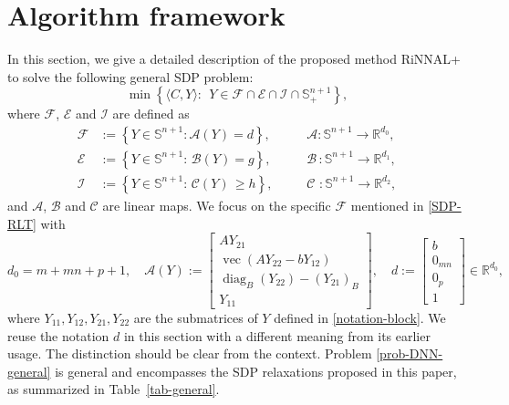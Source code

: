 \documentclass[11pt]{article}
\theoremstyle{plain}
\def\<{\big\langle}
\def\>{\big\rangle}
\def\E{\mathcal{E}}
\def\A{ \mathcal{A} }
\def\B{\mathcal{B}}
\def\C{\mathcal{C}}
\def\F{\mathcal{F}}
\def\I{\mathcal{I}}
\def\R{\mathbb{R}}
\def\S{\mathbb{S}}
\DeclareMathOperator{\diag}{diag}
\begin{document}

\section{Algorithm framework}\label{sec-alg}

In this section, we give a detailed description of the proposed method RiNNAL+ to solve the following general SDP problem:
\begin{equation}\label{prob-DNN-general}
\min\left\{
\<C,Y\>  :\  \
Y\in \F\cap \E\cap\I\cap \mathbb{S}_{+}^{n+1}
\right\},\tag{$P$}
\end{equation}
 where $\F$, $\E$ and $\I$ are defined as
 \begin{equation*}
\begin{aligned}
 \F&:=\left\{Y\in\S^{n+1} :  \mathcal{A}(Y)= {d}  \right\},\,&&\quad\A:\S^{n+1}\rightarrow\R^{d_0},\\
\E&:=\left\{Y\in  \mathbb{S}^{n+1} : \,\B(Y)={g} \right\},\,&&\quad\B\,:\S^{n+1}\rightarrow\R^{d_1},\\
\I &:=\left\{Y\in  \mathbb{S}^{n+1} : \,\C(Y)\,\geq h \right\},&&\quad\C\,\,:\S^{n+1}\rightarrow\R^{d_2},
 \end{aligned}
 \end{equation*}
and $\mathcal{A}$, $\mathcal{B}$ and $\mathcal{C}$ are linear maps.
We focus on the specific $\F$ mentioned in \eqref{SDP-RLT} with
\begin{equation*}
    d_0=m+mn+p+1,\quad
    \mathcal{A}(Y) := \begin{bmatrix}
        AY_{21}\\
        \operatorname{vec}(AY_{22}-bY_{12})\\
        \diag_B(Y_{22})-(Y_{21})_B\\
        Y_{11}
    \end{bmatrix},
    \quad  {d}  := \begin{bmatrix}
        b\\
        0_{mn}\\
        0_{p}\\
        1
    \end{bmatrix}\in\R^{d_0}, 
    \end{equation*}
where $Y_{11},Y_{12},Y_{21},Y_{22}$ are the submatrices of $Y$ defined in \eqref{notation-block}. 
We reuse the notation $d$ in this section with a different meaning from its earlier usage. The distinction should be clear from the context.
Problem \eqref{prob-DNN-general} is general and encompasses the SDP relaxations proposed in this paper, as summarized in Table~\ref{tab-general}.
\end{document}
